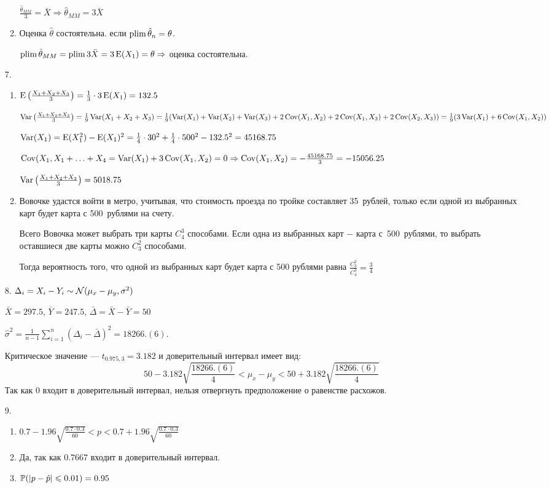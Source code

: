 \begin{enumerate}
\begin{enumerate}
$\frac{\hat \theta_{MM}}{3} = \bar X \Rightarrow \hat \theta_{MM} = 3 \bar X$
\item Оценка $\hat \theta$ состоятельна. если $\plim \hat \theta_n = \theta$.

$\plim \hat \theta_{MM} = \plim 3 \bar X = 3 \E(X_1) = \theta \Rightarrow$ оценка состоятельна.
\end{enumerate}
\item[7.]
\begin{enumerate}
\item $\E\left(\frac{X_1 + X_2 + X_3}{3} \right) = \frac{1}{3} \cdot 3 \E(X_1) = 132.5$

$\Var\left(\frac{X_1 + X_2 + X_3}{3} \right) = \frac{1}{9} \Var(X_1 + X_2 + X_3) =
\frac{1}{9} (\Var(X_1) + \Var(X_2) + \Var(X_3) + 2 \Cov(X_1, X_2) + 2\Cov(X_1, X_3) + 2\Cov(X_2, X_3)) =
\frac{1}{9}(3\Var(X_1) + 6\Cov(X_1,X_2))$

$\Var(X_1) = \E(X_1^2) - \E(X_1)^2 = \frac{1}{4} \cdot 30^2 + \frac{1}{4} \cdot 500^2 - 132.5^2 = 45168.75$

$\Cov(X_1, X_1 + \ldots + X_4 = \Var(X_1) + 3\Cov(X_1,X_2) = 0 \Rightarrow \Cov(X_1,X_2) = -\frac{45168.75}{3} = -15056.25$

$\Var\left(\frac{X_1 + X_2 + X_3}{3} \right) = 5018.75$

\item Вовочке удастся войти в метро, учитывая, что стоимость проезда по тройке составляет 35~рублей, только если одной из выбранных карт будет карта с 500~рублями на счету.

Всего Вовочка может выбрать три карты $C_4^3$ способами. Если одна из выбранных карт $-$ карта с~500~рублями, то выбрать оставшиеся две карты можно $C_3^2$ способами.

Тогда вероятность того, что одной из выбранных карт будет карта с 500 рублями равна $\displaystyle\frac{C_3^2}{C_4^3} = \frac{3}{4}$

\end{enumerate}
\item[8.] $\Delta_i = X_i - Y_i \sim \cN(\mu_x - \mu_y, \sigma^2)$

$\bar X = 297.5$, $\bar Y = 247.5$, $\bar \Delta = \bar X - \bar Y = 50$

$\hat \sigma^2 = \frac{1}{n-1} \sum_{i=1}^n (\Delta_i - \bar \Delta)^2 = 18266.(6)$.

Критическое значение — $t_{0.975, 3} = 3.182$ и доверительный интервал имеет вид:
\[
50 - 3.182 \sqrt{\frac{18266.(6)}{4}} < \mu_x - \mu_y < 50 + 3.182 \sqrt{\frac{18266.(6)}{4}}
\]
Так как $0$ входит в доверительный интервал, нельзя отвергнуть предположение о равенстве расхожов.
\item[9.]
\begin{enumerate}
\item $0.7 - 1.96 \sqrt{\frac{0.7 \cdot 0.3}{60}} < p < 0.7 + 1.96 \sqrt{\frac{0.7 \cdot 0.3}{60}} $
\item Да, так как $0.7667$ входит в доверительный интервал.
\item $\P(|p - \hat p| \leq 0.01) = 0.95$


\end{enumerate}
\end{enumerate}
